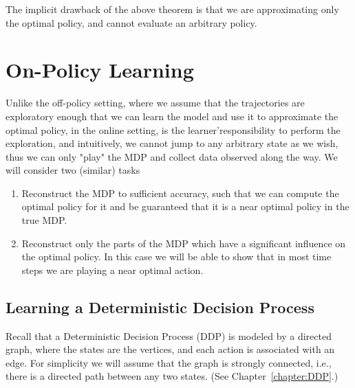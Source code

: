 The implicit drawback of the above theorem is that we are
approximating only the optimal policy, and cannot evaluate an
arbitrary policy.

\section{On-Policy Learning}

Unlike the off-policy setting, where we assume that the trajectories
are exploratory enough that we can learn the model and use it to approximate
the optimal policy, in the online setting, is the learner'\state responsibility
to perform the exploration, and intuitively, we cannot jump to any arbitrary state as we wish, 
thus we can only "play" the MDP and collect data observed along the way. We will consider two (similar) tasks
\begin{enumerate}
	\item Reconstruct the MDP to sufficient accuracy, such that we can compute
	the optimal policy for it and be guaranteed that it is a near optimal
	policy in the true MDP. 
	\item Reconstruct only the parts of the MDP which have a significant influence
	on the optimal policy. In this case we will be able to show that in
	most time steps we are playing a near optimal action. 
\end{enumerate}

\subsection{Learning a Deterministic Decision Process}

Recall that a Deterministic Decision Process (DDP) is modeled by a
directed graph, where the states are the vertices, and each action
is associated with an edge. For simplicity we will assume that the
graph is strongly connected, i.e., there is a directed path between
any two states. (See Chapter~\ref{chapter:DDP}.)

